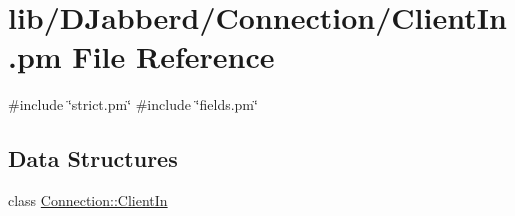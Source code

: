 \hypertarget{_client_in_8pm}{
\section{lib/\-D\-Jabberd/\-Connection/\-Client\-In.pm \-File \-Reference}
\label{_client_in_8pm}
}
{\ttfamily \#include \char`\"{}strict.\-pm\char`\"{}}\*
{\ttfamily \#include \char`\"{}fields.\-pm\char`\"{}}\*
\subsection*{\-Data \-Structures}
\begin{DoxyCompactItemize}
\item 
class \hyperlink{class_d_jabberd_1_1_connection_1_1_client_in}{\-Connection\-::\-Client\-In}
\end{DoxyCompactItemize}
